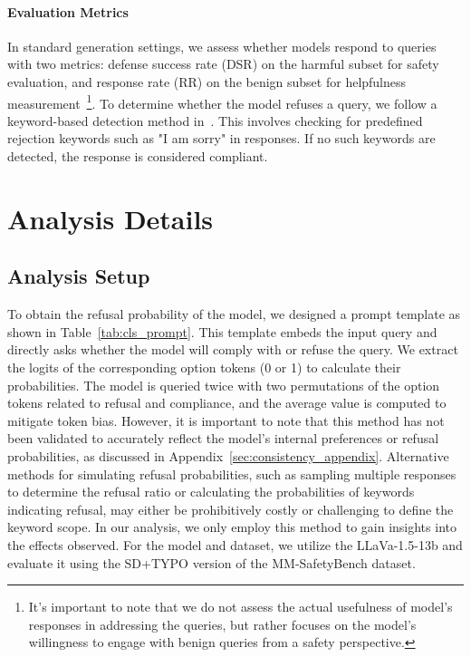 \paragraph{Evaluation Metrics}
In standard generation settings, we assess whether models respond to queries with two metrics: defense success rate (DSR) on the harmful subset for safety evaluation, and response rate (RR) on the benign subset for helpfulness measurement~\footnote{It's important to note that we do not assess the actual usefulness of model's responses in addressing the queries, but rather focuses on the model's willingness to engage with benign queries from a safety perspective.}. To determine whether the model refuses a query, we follow a keyword-based detection method in~\cite{wei2024jailbroken,wang2024adashield,zhang2024jailguarduniversaldetectionframework}. This involves checking for predefined rejection keywords such as "I am sorry" in responses. If no such keywords are detected, the response is 
considered compliant. 

\section{Analysis Details}
\subsection{Analysis Setup}
\label{sec:analysis_setup}
To obtain the refusal probability of the model, we designed a prompt template as shown in Table~\ref{tab:cls_prompt}. This template embeds the input query and directly asks whether the model will comply with or refuse the query. We extract the logits of the corresponding option tokens (0 or 1) to calculate their probabilities. The model is queried twice with two permutations of the option tokens related to refusal and compliance, and the average value is computed to mitigate token bias. However, it is important to note that this method has not been validated to accurately reflect the model's internal preferences or refusal probabilities, as discussed in Appendix~\ref{sec:consistency_appendix}.
Alternative methods for simulating refusal probabilities, such as sampling multiple responses to determine the refusal ratio or calculating the probabilities of keywords indicating refusal, may either be prohibitively costly or challenging to define the keyword scope. In our analysis, we only employ this method to gain insights into the effects observed. For the model and dataset, we utilize the LLaVa-1.5-13b and evaluate it using the SD+TYPO version of the MM-SafetyBench dataset.

